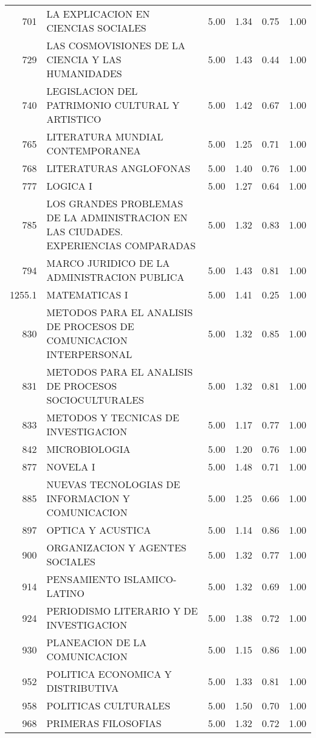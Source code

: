 \documentclass[12pt]{article}
\begin{document}
\begin{table}[ht]
\begin{tabular}{rlrrrr}
  701 & LA EXPLICACION EN CIENCIAS SOCIALES & 5.00 & 1.34 & 0.75 & 1.00 \\ 
  729 & LAS COSMOVISIONES DE LA CIENCIA Y LAS HUMANIDADES & 5.00 & 1.43 & 0.44 & 1.00 \\ 
  740 & LEGISLACION DEL PATRIMONIO CULTURAL Y ARTISTICO & 5.00 & 1.42 & 0.67 & 1.00 \\ 
  765 & LITERATURA MUNDIAL CONTEMPORANEA & 5.00 & 1.25 & 0.71 & 1.00 \\ 
  768 & LITERATURAS ANGLOFONAS & 5.00 & 1.40 & 0.76 & 1.00 \\ 
  777 & LOGICA I & 5.00 & 1.27 & 0.64 & 1.00 \\ 
  785 & LOS GRANDES PROBLEMAS DE LA ADMINISTRACION EN LAS CIUDADES. EXPERIENCIAS COMPARADAS & 5.00 & 1.32 & 0.83 & 1.00 \\ 
  794 & MARCO JURIDICO DE LA ADMINISTRACION PUBLICA & 5.00 & 1.43 & 0.81 & 1.00 \\ 
  1255.1 & MATEMATICAS I & 5.00 & 1.41 & 0.25 & 1.00 \\ 
  830 & METODOS PARA EL ANALISIS DE PROCESOS DE COMUNICACION INTERPERSONAL & 5.00 & 1.32 & 0.85 & 1.00 \\ 
  831 & METODOS PARA EL ANALISIS DE PROCESOS SOCIOCULTURALES & 5.00 & 1.32 & 0.81 & 1.00 \\ 
  833 & METODOS Y TECNICAS DE INVESTIGACION & 5.00 & 1.17 & 0.77 & 1.00 \\ 
  842 & MICROBIOLOGIA & 5.00 & 1.20 & 0.76 & 1.00 \\ 
  877 & NOVELA I & 5.00 & 1.48 & 0.71 & 1.00 \\ 
  885 & NUEVAS TECNOLOGIAS DE INFORMACION Y COMUNICACION & 5.00 & 1.25 & 0.66 & 1.00 \\ 
  897 & OPTICA Y ACUSTICA & 5.00 & 1.14 & 0.86 & 1.00 \\ 
  900 & ORGANIZACION Y AGENTES SOCIALES & 5.00 & 1.32 & 0.77 & 1.00 \\ 
  914 & PENSAMIENTO ISLAMICO-LATINO & 5.00 & 1.32 & 0.69 & 1.00 \\ 
  924 & PERIODISMO LITERARIO Y DE INVESTIGACION & 5.00 & 1.38 & 0.72 & 1.00 \\ 
  930 & PLANEACION DE LA COMUNICACION & 5.00 & 1.15 & 0.86 & 1.00 \\ 
  952 & POLITICA ECONOMICA Y DISTRIBUTIVA & 5.00 & 1.33 & 0.81 & 1.00 \\ 
  958 & POLITICAS CULTURALES & 5.00 & 1.50 & 0.70 & 1.00 \\ 
  968 & PRIMERAS FILOSOFIAS & 5.00 & 1.32 & 0.72 & 1.00 \\ 

\end{tabular}
\end{table}
\end{document}
